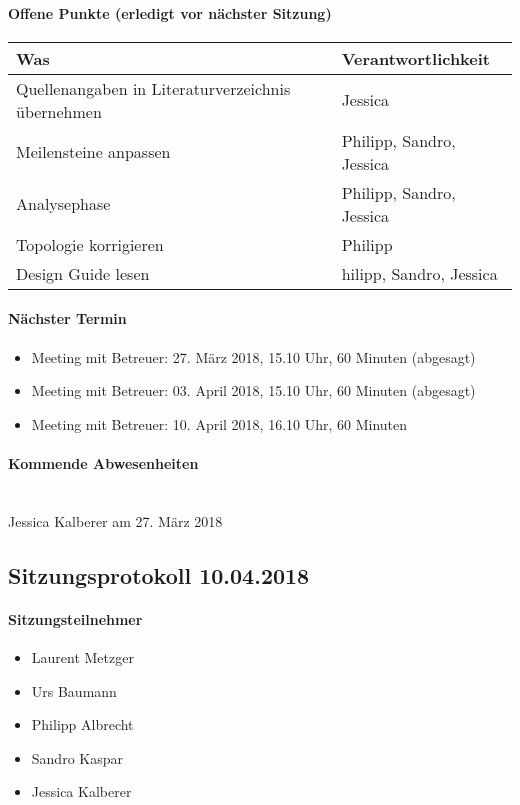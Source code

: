 \paragraph{Offene Punkte (erledigt vor nächster Sitzung)} \mbox{}

\begin{table}[H]
	\centering
	\begin{tabularx}{\textwidth}{X | p{4.5cm}}
		\rowcolor{gray!50}
		\textbf{Was} & \textbf{Verantwortlichkeit} \\
		\hline
		Quellenangaben in Literaturverzeichnis übernehmen & Jessica \\
		Meilensteine anpassen & Philipp, Sandro, Jessica \\
		Analysephase & 	Philipp, Sandro, Jessica \\
		Topologie korrigieren & Philipp \\
		Design Guide lesen & hilipp, Sandro, Jessica \\
	\end{tabularx}
	\label{tab:my-label}
\end{table}

\paragraph{Nächster Termin}
\begin{itemize}	
	\item Meeting mit Betreuer: 27. März 2018, 15.10 Uhr, 60 Minuten (abgesagt)
	\item Meeting mit Betreuer: 03. April 2018, 15.10 Uhr, 60 Minuten (abgesagt)
	\item Meeting mit Betreuer: 10. April 2018, 16.10 Uhr, 60 Minuten
\end{itemize}

\paragraph{Kommende Abwesenheiten} \mbox{}\\
Jessica Kalberer am 27. März 2018
\newpage





\subsection{Sitzungsprotokoll 10.04.2018}

\paragraph{Sitzungsteilnehmer}
\begin{itemize}	
	\item Laurent Metzger 
	\item Urs Baumann
	\item Philipp Albrecht
	\item Sandro Kaspar
	\item Jessica Kalberer
\end{itemize}

